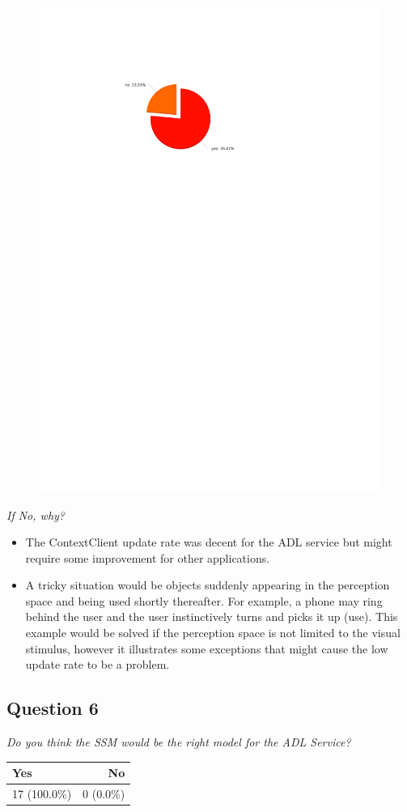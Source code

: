 \begin{figure}[H]
	\centering
	\includegraphics[width=0.6\linewidth]{gfx/Chapter_EvaluationResults/ALFTask/question5}
\end{figure}

\emph{If No, why?}
\begin{itemize}
	\item The ContextClient update rate was decent for the ADL service but might require some improvement for other applications.
	\item A tricky situation would be objects suddenly appearing in the perception space and being used shortly thereafter. For example, a phone may ring behind the user and the user instinctively turns and picks it up (use). This example would be solved if the perception space is not limited to the visual stimulus, however it illustrates some exceptions that might cause the low update rate to be a problem.
\end{itemize}

\subsection{Question 6}
\emph{Do you think the SSM would be the right model for the ADL Service?}
\begin{table}[H]
	\begin{center}
		\small \begin{tabular*}{0.35\columnwidth}{lr}
			\\ \hline \hline
			Yes & No \\ \hline \hline

		 	17 (100.0\%) & 0 (0.0\%)\\ \hline
		\end{tabular*}
	\end{center}
\end{table}

